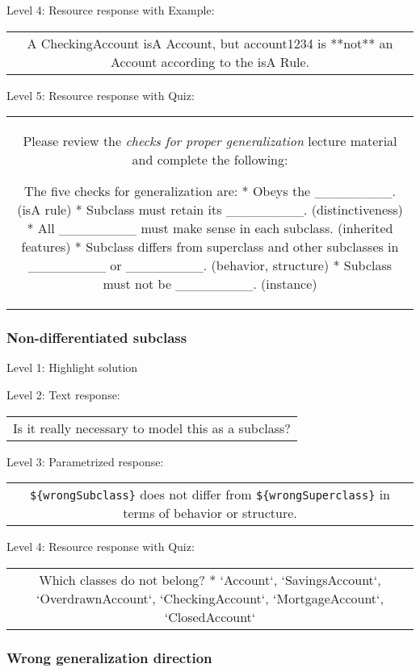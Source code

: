 \noindent Level 4: Resource response with Example:

\begin{tabular}{|c}
A CheckingAccount isA Account, but account1234 is **not** an Account according to the isA Rule.
\end{tabular} \medskip

\noindent Level 5: Resource response with Quiz:

\begin{tabular}{|c}
Please review the \textit{checks for proper generalization} lecture material
and complete the following:

The five checks for generalization are:
* Obeys the ________. (isA rule)
* Subclass must retain its ________. (distinctiveness)
* All ________ must make sense in each subclass. (inherited features)
* Subclass differs from superclass and other subclasses in ________ or ________. 
(behavior, structure)
* Subclass must not be ________. (instance)
\end{tabular} \medskip


\subsubsection{Non-differentiated subclass}

\noindent Level 1: Highlight solution \medskip

\noindent Level 2: Text response: \medskip

\begin{tabular}{|c}
Is it really necessary to model this as a subclass?
\end{tabular} \medskip

\noindent Level 3: Parametrized response: \medskip

\begin{tabular}{|c}
\verb|${wrongSubclass}| does not differ from \verb|${wrongSuperclass}| in terms of behavior or structure.
\end{tabular} \medskip

\noindent Level 4: Resource response with Quiz:

\begin{tabular}{|c}
Which classes do not belong?
* `Account`, `SavingsAccount`, `OverdrawnAccount`, `CheckingAccount`, `MortgageAccount`,
`ClosedAccount`
\end{tabular} \medskip


\subsubsection{Wrong generalization direction}


